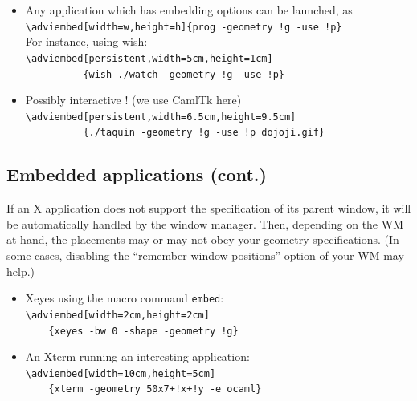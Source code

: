 \documentclass[12pt]{article}
\begin{document}
\begin{itemize}
  \item Any application which has embedding options can be launched, as\\
   \verb+\adviembed[width=w,height=h]{prog -geometry !g -use !p}+\\
   For instance, using wish:\\
   \verb|\adviembed[persistent,width=5cm,height=1cm]|\\
   \verb|          {wish ./watch -geometry !g -use !p}|\\
\adviwait
  \item Possibly interactive ! (we use CamlTk here)\\
   \verb|\adviembed[persistent,width=6.5cm,height=9.5cm]|\\
   \verb|          {./taquin -geometry !g -use !p dojoji.gif}|\\

\end{itemize}

\newpage

\subsection* {Embedded applications (cont.)}

If an X application does not support the specification of its parent
window, it will be automatically handled by the window manager.  Then,
depending on the WM at hand, the placements may or may not obey your
geometry specifications. (In some cases, disabling the ``remember window
positions'' option of your WM may help.)

\begin{itemize}
 \item Xeyes using the macro command \verb|embed|:\\
   \verb|\adviembed[width=2cm,height=2cm]|\\
   \verb|    {xeyes -bw 0 -shape -geometry !g}|\\

 \item An Xterm running an interesting application:\\
   \verb|\adviembed[width=10cm,height=5cm]|\\
   \verb|    {xterm -geometry 50x7+!x+!y -e ocaml}|\\
\end{itemize}
\end{document}
